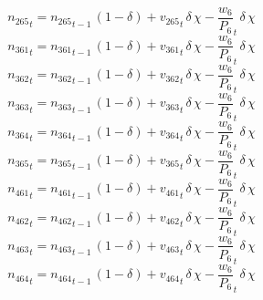 \begin{dmath}
{{n_{265}}}_{t}={{n_{265}}}_{t-1}\, \left(1-{{\delta}}\right)+{{v_{265}}}_{t}\, {{\delta}}\, {{\chi}}-{{\frac{w_{6}}{P_{6}}}}_{t}\, {{\delta}}\, {{\chi}}
\end{dmath}
\begin{dmath}
{{n_{361}}}_{t}={{n_{361}}}_{t-1}\, \left(1-{{\delta}}\right)+{{v_{361}}}_{t}\, {{\delta}}\, {{\chi}}-{{\frac{w_{6}}{P_{6}}}}_{t}\, {{\delta}}\, {{\chi}}
\end{dmath}
\begin{dmath}
{{n_{362}}}_{t}={{n_{362}}}_{t-1}\, \left(1-{{\delta}}\right)+{{v_{362}}}_{t}\, {{\delta}}\, {{\chi}}-{{\frac{w_{6}}{P_{6}}}}_{t}\, {{\delta}}\, {{\chi}}
\end{dmath}
\begin{dmath}
{{n_{363}}}_{t}={{n_{363}}}_{t-1}\, \left(1-{{\delta}}\right)+{{v_{363}}}_{t}\, {{\delta}}\, {{\chi}}-{{\frac{w_{6}}{P_{6}}}}_{t}\, {{\delta}}\, {{\chi}}
\end{dmath}
\begin{dmath}
{{n_{364}}}_{t}={{n_{364}}}_{t-1}\, \left(1-{{\delta}}\right)+{{v_{364}}}_{t}\, {{\delta}}\, {{\chi}}-{{\frac{w_{6}}{P_{6}}}}_{t}\, {{\delta}}\, {{\chi}}
\end{dmath}
\begin{dmath}
{{n_{365}}}_{t}={{n_{365}}}_{t-1}\, \left(1-{{\delta}}\right)+{{v_{365}}}_{t}\, {{\delta}}\, {{\chi}}-{{\frac{w_{6}}{P_{6}}}}_{t}\, {{\delta}}\, {{\chi}}
\end{dmath}
\begin{dmath}
{{n_{461}}}_{t}={{n_{461}}}_{t-1}\, \left(1-{{\delta}}\right)+{{v_{461}}}_{t}\, {{\delta}}\, {{\chi}}-{{\frac{w_{6}}{P_{6}}}}_{t}\, {{\delta}}\, {{\chi}}
\end{dmath}
\begin{dmath}
{{n_{462}}}_{t}={{n_{462}}}_{t-1}\, \left(1-{{\delta}}\right)+{{v_{462}}}_{t}\, {{\delta}}\, {{\chi}}-{{\frac{w_{6}}{P_{6}}}}_{t}\, {{\delta}}\, {{\chi}}
\end{dmath}
\begin{dmath}
{{n_{463}}}_{t}={{n_{463}}}_{t-1}\, \left(1-{{\delta}}\right)+{{v_{463}}}_{t}\, {{\delta}}\, {{\chi}}-{{\frac{w_{6}}{P_{6}}}}_{t}\, {{\delta}}\, {{\chi}}
\end{dmath}
\begin{dmath}
{{n_{464}}}_{t}={{n_{464}}}_{t-1}\, \left(1-{{\delta}}\right)+{{v_{464}}}_{t}\, {{\delta}}\, {{\chi}}-{{\frac{w_{6}}{P_{6}}}}_{t}\, {{\delta}}\, {{\chi}}
\end{dmath}
